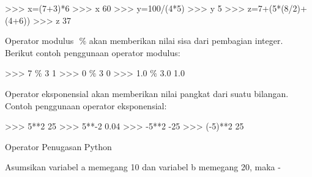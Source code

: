 \vspace{12pt}
\noindent 
>>> x=(7+3)*6\vspace{\baselineskip}
>>> x\vspace{\baselineskip}
60\vspace{\baselineskip}
>>> y=100/(4*5)\vspace{\baselineskip}
>>> y\vspace{\baselineskip}
5\vspace{\baselineskip}
>>> z=7+(5*(8/2)+(4+6))\vspace{\baselineskip}
>>> z\vspace{\baselineskip}
37 \par
\vspace{12pt}
\noindent 
Operator modulus $  $ $  \%  $ $  $akan memberikan nilai sisa dari pembagian integer. Berikut contoh penggunaan operator modulus: \par
\vspace{12pt}
\noindent 
>>> 7  $  \%  $ 3\vspace{\baselineskip}
1\vspace{\baselineskip}
>>> 0  $  \%  $ 3\vspace{\baselineskip}
0\vspace{\baselineskip}
>>> 1.0  $  \%  $ 3.0\vspace{\baselineskip}
1.0 \par
\vspace{12pt}
\noindent 
Operator eksponensial $  $akan memberikan nilai pangkat dari suatu bilangan. Contoh penggunaan operator eksponensial: \par
\vspace{12pt}
\noindent 
>>> 5**2\vspace{\baselineskip}
25\vspace{\baselineskip}
>>> 5**-2\vspace{\baselineskip}
0.04\vspace{\baselineskip}
>>> -5**2\vspace{\baselineskip}
-25\vspace{\baselineskip}
>>> (-5)**2\vspace{\baselineskip}
25 \par
\vspace{12pt}
\noindent 
Operator Penugasan Python \par
\vspace{12pt}
\noindent 
Asumsikan variabel a memegang 10 dan variabel b memegang 20, maka - \par
\vspace{12pt}
